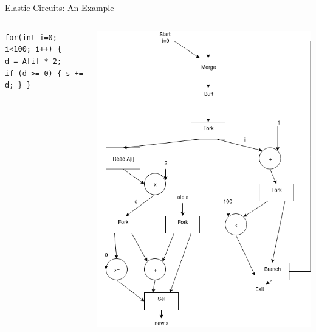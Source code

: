 \documentclass[page number]{beamer}
\begin{document}
\begin{frame}{Elastic Circuits: An Example}
  \begin{columns}
    \begin{column}{0.4\textwidth}
      \scriptsize
\texttt{for(int i=0; i<100; i++)   \{}\\
\texttt{d = A[i] * 2;}\\
\texttt{if (d >= 0) \{ s += d; \}  \} }
      \normalsize    
    \end{column}
    \begin{column}{0.6\textwidth}  %
      \begin{center}
        \includegraphics[scale=0.3]{circuit.png}
      \end{center}
    \end{column}
  \end{columns}
\end{frame}
\end{document}
